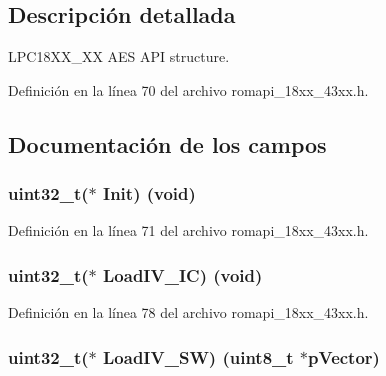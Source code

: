 \subsection{Descripción detallada}
L\+P\+C18\+X\+X\+\_\+XX A\+ES A\+PI structure. 

Definición en la línea 70 del archivo romapi\+\_\+18xx\+\_\+43xx.\+h.



\subsection{Documentación de los campos}
\subsubsection[{\texorpdfstring{Init}{Init}}]{\setlength{\rightskip}{0pt plus 5cm}uint32\+\_\+t($\ast$ Init) (void)}\hypertarget{struct_a_e_s___a_p_i___t_a8a4babfa1f2262f27ab56052d32844a9}{}\label{struct_a_e_s___a_p_i___t_a8a4babfa1f2262f27ab56052d32844a9}


Definición en la línea 71 del archivo romapi\+\_\+18xx\+\_\+43xx.\+h.

\subsubsection[{\texorpdfstring{Load\+I\+V\+\_\+\+IC}{LoadIV_IC}}]{\setlength{\rightskip}{0pt plus 5cm}uint32\+\_\+t($\ast$ Load\+I\+V\+\_\+\+IC) (void)}\hypertarget{struct_a_e_s___a_p_i___t_a22c872b86b59b412081dac3ce552460e}{}\label{struct_a_e_s___a_p_i___t_a22c872b86b59b412081dac3ce552460e}


Definición en la línea 78 del archivo romapi\+\_\+18xx\+\_\+43xx.\+h.

\subsubsection[{\texorpdfstring{Load\+I\+V\+\_\+\+SW}{LoadIV_SW}}]{\setlength{\rightskip}{0pt plus 5cm}uint32\+\_\+t($\ast$ Load\+I\+V\+\_\+\+SW) (uint8\+\_\+t $\ast$p\+Vector)}\hypertarget{struct_a_e_s___a_p_i___t_a272fe17e4249cd0de2eb81f37739f418}{}\label{struct_a_e_s___a_p_i___t_a272fe17e4249cd0de2eb81f37739f418}


